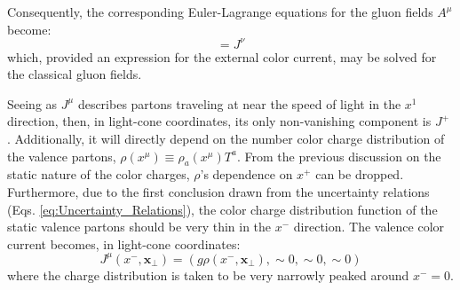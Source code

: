 Consequently, the corresponding Euler-Lagrange equations for the gluon fields $A^\mu$ become:
\begin{equation}
	[D_\mu, F^{\mu \nu}] = J^\nu
\end{equation}
which, provided an expression for the external color current, may be solved for the classical gluon fields.

Seeing as $J^\mu$ describes partons traveling at near the speed of light in the $x^1$ direction, then, in light-cone coordinates, its only non-vanishing component is $J^+$ . Additionally, it will directly depend on the number color charge distribution of the valence partons, $\rho (x^\mu) \equiv \rho_a(x^\mu) T^a$.
From the previous discussion on the static nature of the color charges, $\rho$'s dependence on $x^+$ can be dropped. Furthermore, due to the first conclusion drawn from the uncertainty relations (Eqs. \ref{eq:Uncertainty_Relations}), the color charge distribution function of the static valence partons should be very thin in the $x^-$ direction. 
The valence color current becomes, in light-cone coordinates:
\begin{equation}
	{J}^\mu (x^-,\mathbf{x}_\perp) = (g \rho (x^-,\mathbf{x}_\perp), \sim 0, \sim 0, \sim 0)
	\label{eq:+_Current}
\end{equation}
where the charge distribution is taken to be very narrowly peaked around $x^-=0$.

